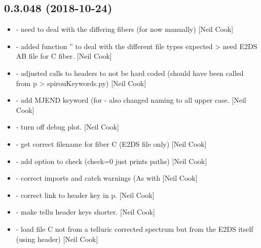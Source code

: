\documentclass[a4paper,10pt,english]{report}
\begin{document}
\subsection{0.3.048 (2018-10-24)}
\label{\detokenize{misc/changelog:id283}}\begin{itemize}
\item {} 
 - need to deal with the differing fibers (for now
manually) {[}Neil Cook{]}

\item {} 
 - added function ” to deal with the
different file types expected \textendash{}\textgreater{} need E2DS AB file for C fiber. {[}Neil
Cook{]}

\item {} 
 - adjusted calls to headers to not be hard coded
(should have been called from p \textendash{}\textgreater{} spirouKeywords.py) {[}Neil Cook{]}

\item {} 
 - add MJEND keyword (for  - also
changed naming to all upper case. {[}Neil Cook{]}

\item {} 
 - turn off debug plot. {[}Neil Cook{]}

\item {} 
 - get correct filename for fiber C (E2DS
file only) {[}Neil Cook{]}

\item {} 
 - add option to check (check=0 just prints
paths) {[}Neil Cook{]}

\item {} 
 - correct imports and catch warnings (As
with  {[}Neil Cook{]}

\item {} 
 - correct link to header key in p. {[}Neil
Cook{]}

\item {} 
 - make tellu header keys shorter. {[}Neil Cook{]}

\item {} 
 - load file C not from a telluric corrected
spectrum but from the E2DS itself (using header) {[}Neil Cook{]}


\end{itemize}
\end{document}
